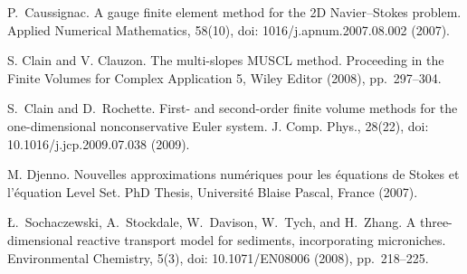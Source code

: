 
\begin{thebibliography}{10}
{\sc P.~Caussignac}. {A gauge finite element method for the 2D Navier--Stokes problem}. Applied Numerical Mathematics, 58(10), doi: 1016/j.apnum.2007.08.002 (2007).

{\sc S. Clain and V. Clauzon}. {The multi-slopes MUSCL method}. Proceeding in the Finite Volumes for Complex Application 5, Wiley Editor (2008), pp.~297--304.

{\sc S.~Clain and D.~Rochette}. {First- and second-order finite volume methods for the one-dimensional nonconservative Euler system}. J. Comp. Phys., 28(22), doi: 10.1016/j.jcp.2009.07.038 (2009).

{\sc M. Djenno}. {Nouvelles approximations num\'eriques pour les \'equations de Stokes et l'\'equation Level Set}. PhD Thesis, Universit\'e Blaise Pascal, France (2007).

{\sc \L.~Sochaczewski, A.~Stockdale, W.~Davison, W.~Tych, and H.~Zhang}. {A three-dimensional reactive transport model for sediments, incorporating microniches}. Environmental Chemistry, 5(3), doi: 10.1071/EN08006 (2008),  pp.~218--225.
\end{thebibliography}